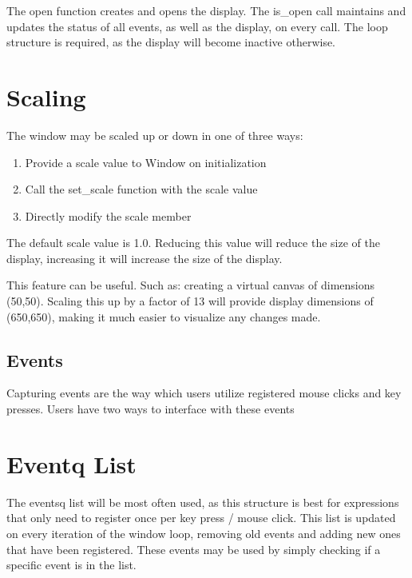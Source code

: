 \documentclass[letterpaper,10pt,english,openany,oneside]{sphinxmanual}
\begin{document}
\begin{sphinxVerbatim}[commandchars=\\\{\}]
 
\end{sphinxVerbatim}

\sphinxAtStartPar
The open function creates and opens the display. The is\_open call maintains and updates the status of all events, as well as the display, on every call. The loop structure is required, as the display will become inactive otherwise.


\section{Scaling}
\label{\detokenize{fundamentals:scaling}}
\sphinxAtStartPar
The window may be scaled up or down in one of three ways:
\begin{enumerate}
%
\item {} 
\sphinxAtStartPar
Provide a scale value to Window on initialization

\item {} 
\sphinxAtStartPar
Call the set\_scale function with the scale value

\item {} 
\sphinxAtStartPar
Directly modify the scale member

\end{enumerate}

\sphinxAtStartPar
The default scale value is 1.0. Reducing this value will reduce the size of the display, increasing it will increase the size of the display.

\sphinxAtStartPar
This feature can be useful. Such as:
creating a virtual canvas of dimensions (50,50). Scaling this up by a factor of 13 will provide display dimensions of (650,650), making it much easier to visualize any changes made.


\subsection{Events}
\label{\detokenize{fundamentals:events}}
\sphinxAtStartPar
Capturing events are the way which users utilize registered mouse clicks and key presses. Users have two ways to interface with these events


\section{Eventq List}
\label{\detokenize{fundamentals:eventq-list}}
\sphinxAtStartPar
The eventsq list will be most often used, as this structure is best for expressions that only need to register once per key press / mouse click. This list is updated on every iteration of the window loop, removing old events and adding new ones that have been registered. These events may be used by simply checking if a specific event is in the list.
\end{document}
